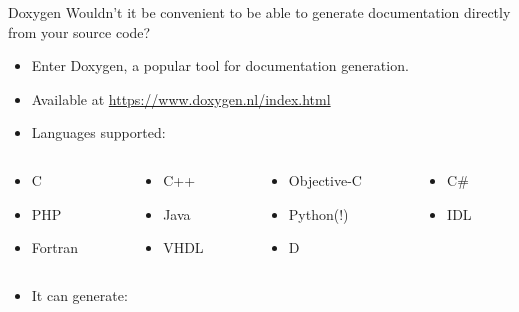 \documentclass[11pt]{beamer}
\begin{document}
\begin{frame}[fragile=singleslide]{Doxygen}
Wouldn't it be convenient to be able to generate documentation directly from your source code? 
\begin{itemize}
\item Enter Doxygen, a popular tool for documentation generation.
\item Available at \url{https://www.doxygen.nl/index.html}
\item Languages supported:
\end{itemize}
\begin{columns}
\begin{column}{0.25\textwidth}
\begin{itemize}
\item C
\item PHP
\item Fortran
\end{itemize}
\end{column}
\begin{column}{0.25\textwidth}
\begin{itemize}
\item C++
\item Java
\item VHDL
\end{itemize}
\end{column}
\begin{column}{0.25\textwidth}
\begin{itemize}
\item Objective-C
\item Python(!)
\item D
\end{itemize}
\end{column}
\begin{column}{0.25\textwidth}
\begin{itemize}
\item C\#
\item IDL
\end{itemize}
\vspace{1em}
\end{column}
\end{columns}
\vspace{0.25em}
\begin{itemize}
\item It can generate:
\end{itemize}
\vspace{-1em}
\begin{columns}
\begin{column}{0.25\textwidth}

\end{column}
\end{columns}
\end{frame}
\end{document}
